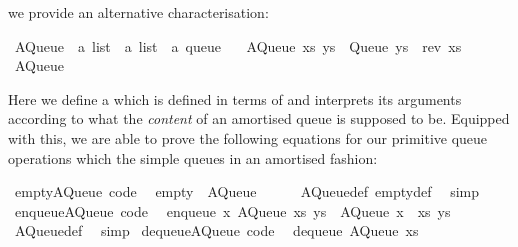 \begin{isabellebody}
\begin{isamarkuptext}
  we provide an alternative characterisation:%
\end{isamarkuptext}%
\isamarkuptrue%
%
\isadelimquote
%
\endisadelimquote
%
\isatagquote
{}\isamarkupfalse%
\ AQueue\ {\isacharcolon}{\isacharcolon}\ {\isachardoublequoteopen}{\isacharprime}a\ list\ {\isasymRightarrow}\ {\isacharprime}a\ list\ {\isasymRightarrow}\ {\isacharprime}a\ queue{\isachardoublequoteclose}\ \isanewline
\ \ {\isachardoublequoteopen}AQueue\ xs\ ys\ {\isacharequal}\ Queue\ {\isacharparenleft}ys\ {\isacharat}\ rev\ xs{\isacharparenright}{\isachardoublequoteclose}\isanewline
\isanewline
{}\isamarkupfalse%
\ AQueue%
\endisatagquote
{\isafoldquote}%
%
\isadelimquote
%
\endisadelimquote
%
\begin{isamarkuptext}%
\noindent Here we define a   which
  is defined in terms of  and interprets its arguments
  according to what the \emph{content} of an amortised queue is supposed
  to be.  Equipped with this, we are able to prove the following equations
  for our primitive queue operations which  the simple
  queues in an amortised fashion:%
\end{isamarkuptext}%
\isamarkuptrue%
%
\isadelimquote
%
\endisadelimquote
%
\isatagquote
{}\isamarkupfalse%
\ empty{\isacharunderscore}AQueue\ {\isacharbrackleft}code{\isacharbrackright}{\isacharcolon}\isanewline
\ \ {\isachardoublequoteopen}empty\ {\isacharequal}\ AQueue\ {\isacharbrackleft}{\isacharbrackright}\ {\isacharbrackleft}{\isacharbrackright}{\isachardoublequoteclose}\isanewline
\ \ \isamarkupfalse%
\ AQueue{\isacharunderscore}def\ empty{\isacharunderscore}def\ \isamarkupfalse%
\ simp\isanewline
\isanewline
{}\isamarkupfalse%
\ enqueue{\isacharunderscore}AQueue\ {\isacharbrackleft}code{\isacharbrackright}{\isacharcolon}\isanewline
\ \ {\isachardoublequoteopen}enqueue\ x\ {\isacharparenleft}AQueue\ xs\ ys{\isacharparenright}\ {\isacharequal}\ AQueue\ {\isacharparenleft}x\ {\isacharhash}\ xs{\isacharparenright}\ ys{\isachardoublequoteclose}\isanewline
\ \ \isamarkupfalse%
\ AQueue{\isacharunderscore}def\ \isamarkupfalse%
\ simp\isanewline
\isanewline
{}\isamarkupfalse%
\ dequeue{\isacharunderscore}AQueue\ {\isacharbrackleft}code{\isacharbrackright}{\isacharcolon}\isanewline
\ \ {\isachardoublequoteopen}dequeue\ {\isacharparenleft}AQueue\ xs\ {\isacharbrackleft}{\isacharbrackright}{\isacharparenright}\ {\isacharequal}\isanewline

\end{isabellebody}
